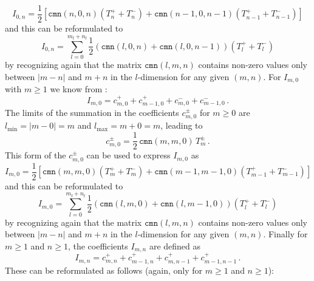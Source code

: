 \begin{equation}
  I_{0,n} = \frac{1}{2} \left[
      \mathtt{cmn}(n,0,n)     \left( T^{+}_n + T^{-}_n \right)
    + \mathtt{cmn}(n-1,0,n-1) \left( T^{+}_{n-1} + T^{-}_{n-1} \right)
    \right]
\end{equation}
and this can be reformulated to
\begin{equation}
  I_{0,n} = \sum_{l=0}^{m_\mathrm{f} + n_\mathrm{f}}
    \frac{1}{2} \left( \mathtt{cmn}(l,0,n) + \mathtt{cmn}(l,0,n-1) \right)
    \left( T^{+}_l + T^{-}_l \right) \label{eqn:I_0n}
\end{equation}
by recognizing again that the matrix $\mathtt{cmn}(l,m,n)$ contains non-zero values only between $|m-n|$ and $m+n$
in the $l$-dimension for any given $(m,n)$.
For $I_{m,0}$ with $m \geq 1$ we know from :
\begin{equation}
  I_{m,0} = c^{+}_{m,0} + c^{+}_{m-1,0} + c^{-}_{m,0} + c^{-}_{m-1,0} \, .
\end{equation}
The limits of the summation in the coefficients $c^{\pm}_{m,0}$ for $m\geq 0$
are $l_\mathrm{min} = |m-0| = m$ and $l_\mathrm{max} = m+0 = m$, leading to
\begin{equation}
  c^{\pm}_{m,0} = \frac{1}{2} \,\mathtt{cmn}(m,m,0)\, T^{\pm}_m \, .
\end{equation}
This form of the $c^{\pm}_{m,0}$ can be used to express $I_{m,0}$ as
\begin{equation}
  I_{m,0} = \frac{1}{2} \left[
      \mathtt{cmn}(m,m,0)     \left( T^{+}_m + T^{-}_m \right)
    + \mathtt{cmn}(m-1,m-1,0) \left( T^{+}_{m-1} + T^{-}_{m-1} \right)
    \right]
\end{equation}
and this can be reformulated to
\begin{equation}
  I_{m,0} = \sum_{l=0}^{m_\mathrm{f} + n_\mathrm{f}}
    \frac{1}{2} \left( \mathtt{cmn}(l,m,0) + \mathtt{cmn}(l,m-1,0) \right)
    \left( T^{+}_l + T^{-}_l \right) \label{eqn:I_m0}
\end{equation}
by recognizing again that the matrix $\mathtt{cmn}(l,m,n)$ contains non-zero values only between $|m-n|$ and $m+n$
in the $l$-dimension for any given $(m,n)$.
Finally for $m \geq 1$ and $n \geq 1$, the coefficients $I_{m,n}$ are defined as
\begin{equation}
  I_{m,n} = c^{+}_{m,n} + c^{+}_{m-1,n} + c^{+}_{m,n-1} + c^{+}_{m-1,n-1} \, .
\end{equation}
These can be reformulated as follows (again, only for $m \geq 1$ and $n \geq 1$):
